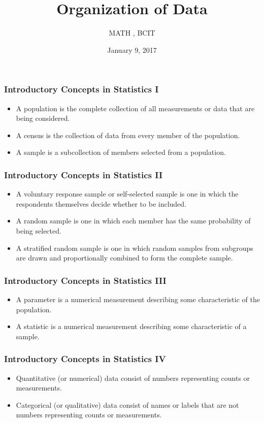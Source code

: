 \documentclass[xcolor=dvipsnames]{beamer}
\title{Organization of Data}
\subtitle{MATH {\CourseNumber}, BCIT}
\author{\CourseName}
\date{January 9, 2017}
\begin{document}
\begin{frame}
  \titlepage
\end{frame}

\begin{frame}
  \frametitle{Introductory Concepts in Statistics I}
  \begin{itemize}
  \item<1-> A \alert{population} is the complete collection of all
    measurements or data that are being considered.
  \item<2-> A \alert{census} is the collection of data from every
    member of the population.
  \item<3-> A \alert{sample} is a subcollection of members selected
    from a population.
  \end{itemize}
\end{frame}

\begin{frame}
  \frametitle{Introductory Concepts in Statistics II}
  \begin{itemize}
  \item<1-> A \alert{voluntary response sample} or
    \alert{self-selected sample} is one in which the respondents
    themselves decide whether to be included.
  \item<2-> A \alert{random sample} is one in which each member has
    the same probability of being selected.
  \item<3-> A \alert{stratified random sample} is one in which random
    samples from subgroups are drawn and proportionally combined to
    form the complete sample.
  \end{itemize}
\end{frame}

\begin{frame}
  \frametitle{Introductory Concepts in Statistics III}
  \begin{itemize}
  \item<1-> A \alert{parameter} is a numerical measurement describing
    some characteristic of the population.
  \item<2-> A \alert{statistic} is a numerical measurement describing
    some characteristic of a sample.
  \end{itemize}
\end{frame}

\begin{frame}
  \frametitle{Introductory Concepts in Statistics IV}
  \begin{itemize}
  \item<1-> \alert{Quantitative} (or \alert{numerical}) data consist
    of numbers representing counts or measurements.
  \item<2-> \alert{Categorical} (or \alert{qualitative}) data consist
    of names or labels that are not numbers representing counts or
    measurements.
  \end{itemize}
\end{frame}
\end{document}
